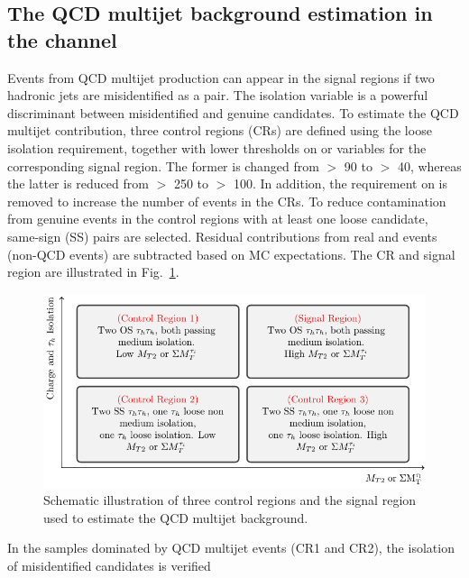 \subsection{\texorpdfstring{The QCD multijet background estimation in the \tauTau channel}{The QCD multijet background estimation in the tau-tau channel}}
\label{sect:bkgQCD}
Events from QCD multijet production can appear in the signal regions if two hadronic jets are misidentified as a \tauTau pair.
The isolation variable is a powerful discriminant between misidentified and genuine \Tau candidates. To estimate the QCD multijet contribution, three \tauTau control regions (CRs) are defined using the loose \Tau isolation requirement, together with lower thresholds on \mttwo or \SumMT variables for the corresponding signal region. The former is changed from \mttwo $>$ 90 to $>$ 40\GeV, whereas the latter is reduced from \SumMT $>$ 250 to $>$ 100\GeV. In addition, the requirement on \deltaphi is removed to increase the number of events in the CRs. 
To reduce contamination from genuine \tauTau events 
in the control regions with at least one loose \Tau candidate, 
same-sign (SS) \tauTau pairs are selected. Residual contributions from real 
\tauTau and \wjets events (non-QCD events) are subtracted based on MC expectations. 
The CR and signal region are illustrated in Fig.~\ref{fig:ABCDQCD}. 
\begin{figure}[!htb]
\centering
\includegraphics[angle=0,scale=1.15]{Bkg/ABCD.pdf}
\caption{Schematic illustration of three control regions and the signal region used to estimate the QCD multijet background.}
\label{fig:ABCDQCD}
\end{figure}
In the samples dominated by QCD multijet events (CR1 and CR2), the isolation of misidentified \Tau candidates is verified 
